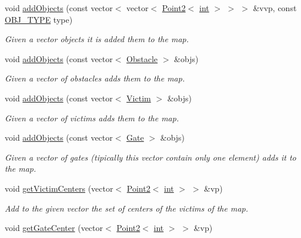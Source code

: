 \begin{DoxyCompactItemize}
void \mbox{\hyperlink{class_mapp_ab235ba9946b7c5e44a4914ca26f6d5fc}{add\+Objects}} (const vector$<$ vector$<$ \mbox{\hyperlink{class_point2}{Point2}}$<$ \mbox{\hyperlink{draw_8hh_aa620a13339ac3a1177c86edc549fda9b}{int}} $>$ $>$ $>$ \&vvp, const \mbox{\hyperlink{map_8hh_a714b9c2c276fbae637fee36453d9121e}{O\+B\+J\+\_\+\+T\+Y\+PE}} type)
\begin{DoxyCompactList}\small\item\em Given a vector objects it is added them to the map. \end{DoxyCompactList}\item 
void \mbox{\hyperlink{class_mapp_a346993a223bdfec975bb6365ef640c2c}{add\+Objects}} (const vector$<$ \mbox{\hyperlink{class_obstacle}{Obstacle}} $>$ \&objs)
\begin{DoxyCompactList}\small\item\em Given a vector of obstacles adds them to the map. \end{DoxyCompactList}\item 
void \mbox{\hyperlink{class_mapp_a46385479c68f30deb76adbf9a5cff9c3}{add\+Objects}} (const vector$<$ \mbox{\hyperlink{class_victim}{Victim}} $>$ \&objs)
\begin{DoxyCompactList}\small\item\em Given a vector of victims adds them to the map. \end{DoxyCompactList}\item 
void \mbox{\hyperlink{class_mapp_a99b3e0e922c4cd5416343ad7e08d8e72}{add\+Objects}} (const vector$<$ \mbox{\hyperlink{class_gate}{Gate}} $>$ \&objs)
\begin{DoxyCompactList}\small\item\em Given a vector of gates (tipically this vector contain only one element) adds it to the map. \end{DoxyCompactList}\item 
void \mbox{\hyperlink{class_mapp_a3b3ad207536bfb80c9ea2fd254bfdd80}{get\+Victim\+Centers}} (vector$<$ \mbox{\hyperlink{class_point2}{Point2}}$<$ \mbox{\hyperlink{draw_8hh_aa620a13339ac3a1177c86edc549fda9b}{int}} $>$ $>$ \&vp)
\begin{DoxyCompactList}\small\item\em Add to the given vector the set of centers of the victims of the map. \end{DoxyCompactList}\item 
void \mbox{\hyperlink{class_mapp_a7b17d1a5e8567021465397088e1dea8d}{get\+Gate\+Center}} (vector$<$ \mbox{\hyperlink{class_point2}{Point2}}$<$ \mbox{\hyperlink{draw_8hh_aa620a13339ac3a1177c86edc549fda9b}{int}} $>$ $>$ \&vp)

\end{DoxyCompactItemize}
